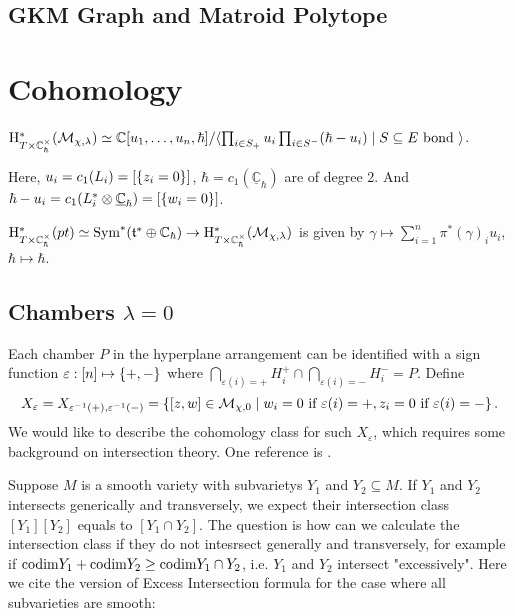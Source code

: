 \documentclass[b5paper]{article}
\newcommand{\mathintitle}[1]{\texorpdfstring{$#1$}{\detokenize{#1}}}
\newcommand{\MM}{\mathcal{M}}
\newcommand{\HH}{\mathrm{H}}
\newcommand{\Chbar}{\mathbb{C}^\times _\hbar}
\begin{document}
\subsection{GKM Graph and Matroid Polytope}
\missing{}

\section{Cohomology}
\begin{theorem}{}
    $\HH^*_{T\times \Chbar}(\MM_{\chi,\lambda})\simeq \mathbb{C}[u_1,\dots ,u_n,\hbar]/\AB{\prod_{i\in S_+}^{}u_i\prod_{i\in S^-}^{}(\hbar-u_i)\mid S\subseteq E\textnormal{ bond }}$.
\begin{remark}
    Here, 
    $u_i=c_1(L_i)=[\left\{z_i=0\right\}]$, $\hbar=c_1(\underline{\mathbb{C}}_\hbar)$ are of degree 2. And $\hbar-u_i=c_1(L_i^*\otimes\underline{\mathbb{C}}_\hbar)=[\left\{w_i=0\right\}]$.
\end{remark}
\begin{remark}
    $\HH^*_{T\times \Chbar}(pt)\simeq \textnormal{Sym}^*(\mathfrak{t}^*\oplus\mathbb{C}_\hbar)\rightarrow \HH^*_{T\times \Chbar}(\MM_{\chi,\lambda})$ is given by $\gamma\mapsto \sum_{i=1}^{n}\pi^*(\gamma)_iu_i$, $\hbar\mapsto \hbar$.
\end{remark}
\end{theorem}

\subsection{Chambers \mathintitle{\lambda=0}}

Each chamber $P$ in the hyperplane arrangement can be identified with a sign function $\varepsilon: [n]\mapsto \left\{+,-\right\}$ where $\bigcap_{\varepsilon(i)=+}H_i^+\cap \bigcap_{\varepsilon(i)=-}H_i^-=P $.
Define 
\[
    X_{\varepsilon}=X_{\varepsilon^{-1}(+),\varepsilon^{-1}(-)}=\CB{[z,w]\in \MM_{\chi,0} \mid w_i=0\textnormal{ if }\varepsilon(i)=+, z_i=0\textnormal{ if }\varepsilon(i)=-}.
\]
We would like to describe the cohomology class for such $X_\varepsilon$, which requires some background on intersection theory. One reference is \cite{eisenbud20163264}.

Suppose $M$ is a smooth variety with subvarietys $Y_1$ and $Y_2\subseteq M$.
If $Y_1$ and $Y_2$ intersects generically and transversely, we expect their intersection class $[Y_1][Y_2]$ equals to $[Y_1\cap Y_2]$. The question is how can we calculate the intersection class if they do not intesrsect generally and transversely, for example if $\textnormal{codim} Y_1+\textnormal{codim} Y_2\geq \textnormal{codim} Y_1\cap Y_2$, i.e. $Y_1$ and $Y_2$ intersect "excessively".
Here we cite the version of Excess Intersection formula for the case where all subvarieties are smooth:
\end{document}
